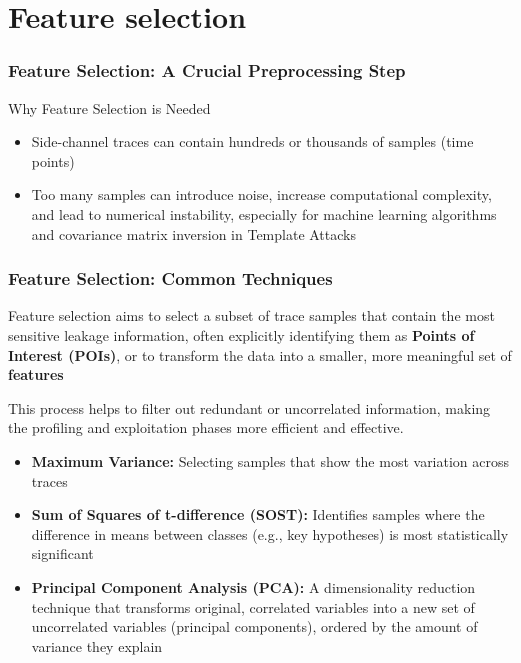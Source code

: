 \section{Feature selection}
\begin{frame}
    \frametitle{Feature Selection: A Crucial Preprocessing Step}
    \begin{block}{Why Feature Selection is Needed}
        \begin{itemize}
            \item Side-channel traces can contain hundreds or thousands of samples (time points)
            \item Too many samples can introduce noise, increase computational complexity, and lead to numerical instability, especially for machine learning algorithms and covariance matrix inversion in Template Attacks
        \end{itemize}
    \end{block}
\end{frame}
\begin{frame}
\frametitle{Feature Selection: Common Techniques}
            \item Feature selection aims to select a subset of trace samples that contain the most sensitive leakage information, often explicitly identifying them as \textbf{Points of Interest (POIs)}, or to transform the data into a smaller, more meaningful set of \textbf{features}
            \item This process helps to filter out redundant or uncorrelated information, making the profiling and exploitation phases more efficient and effective.
    \begin{block}{}
        \begin{itemize}
            \begin{itemize}
                \item \textbf{Maximum Variance:} Selecting samples that show the most variation across traces
                \item \textbf{Sum of Squares of t-difference (SOST):} Identifies samples where the difference in means between classes (e.g., key hypotheses) is most statistically significant
                \item \textbf{Principal Component Analysis (PCA):} A dimensionality reduction technique that transforms original, correlated variables into a new set of uncorrelated variables (principal components), ordered by the amount of variance they explain
            \end{itemize}
        \end{itemize}
    \end{block}
\end{frame}